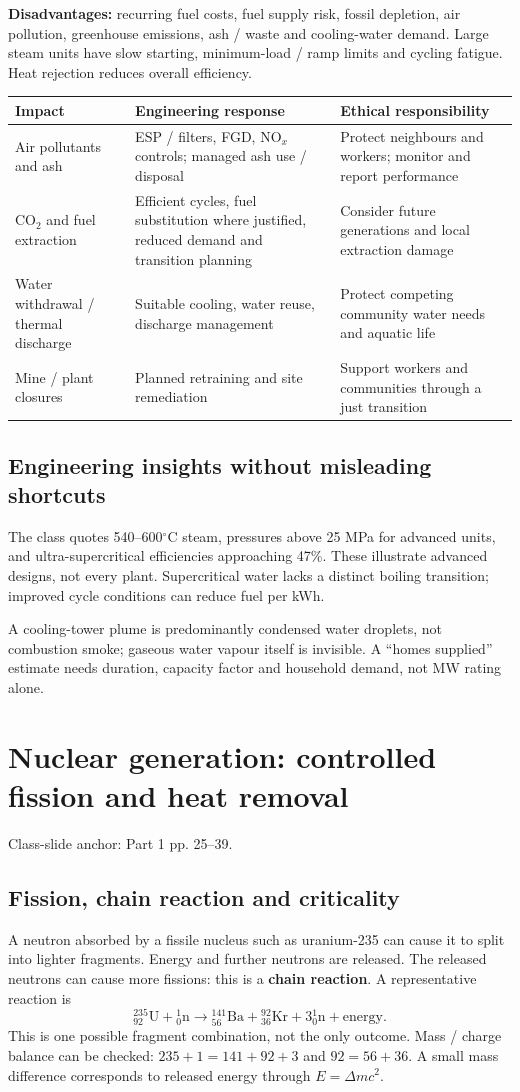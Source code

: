 \documentclass[11pt,a4paper]{article}
\newcommand{\slides}[1]{{\small\color{muted}\textsf{Class-slide anchor: #1.}}\par}
\newcommand{\chapterstart}[2]{\clearpage\section{#1}\label{#2}}
\begin{document}
\textbf{Disadvantages:} recurring fuel costs, fuel supply risk, fossil depletion, air pollution, greenhouse emissions, ash / waste and cooling-water demand. Large steam units have slow starting, minimum-load / ramp limits and cycling fatigue. Heat rejection reduces overall efficiency.

\begin{center}\small
\begin{tabularx}{\textwidth}{L{4cm}YY}
\toprule\textbf{Impact} & \textbf{Engineering response} & \textbf{Ethical responsibility}\\\midrule
Air pollutants and ash & ESP / filters, FGD, NO$_x$ controls; managed ash use / disposal & Protect neighbours and workers; monitor and report performance\\
CO$_2$ and fuel extraction & Efficient cycles, fuel substitution where justified, reduced demand and transition planning & Consider future generations and local extraction damage\\
Water withdrawal / thermal discharge & Suitable cooling, water reuse, discharge management & Protect competing community water needs and aquatic life\\
Mine / plant closures & Planned retraining and site remediation & Support workers and communities through a just transition\\\bottomrule
\end{tabularx}\end{center}

\subsection{Engineering insights without misleading shortcuts}
The class quotes 540--600$^\circ$C steam, pressures above 25 MPa for advanced units, and ultra-supercritical efficiencies approaching 47\%. These illustrate advanced designs, not every plant. Supercritical water lacks a distinct boiling transition; improved cycle conditions can reduce fuel per kWh.

A cooling-tower plume is predominantly condensed water droplets, not combustion smoke; gaseous water vapour itself is invisible. A ``homes supplied'' estimate needs duration, capacity factor and household demand, not MW rating alone.
\chapterstart{Nuclear generation: controlled fission and heat removal}{nuclear}
\slides{Part 1 pp. 25--39}
\subsection{Fission, chain reaction and criticality}
A neutron absorbed by a fissile nucleus such as uranium-235 can cause it to split into lighter fragments. Energy and further neutrons are released. The released neutrons can cause more fissions: this is a \textbf{chain reaction}. A representative reaction is
\[
{}^{235}_{92}\mathrm{U}+{}^1_0\mathrm{n}
\to{}^{141}_{56}\mathrm{Ba}+{}^{92}_{36}\mathrm{Kr}+3{}^1_0\mathrm{n}+\text{energy}.
\]
This is one possible fragment combination, not the only outcome. Mass / charge balance can be checked: $235+1=141+92+3$ and $92=56+36$. A small mass difference corresponds to released energy through $E=\Delta m c^2$.
\end{document}
